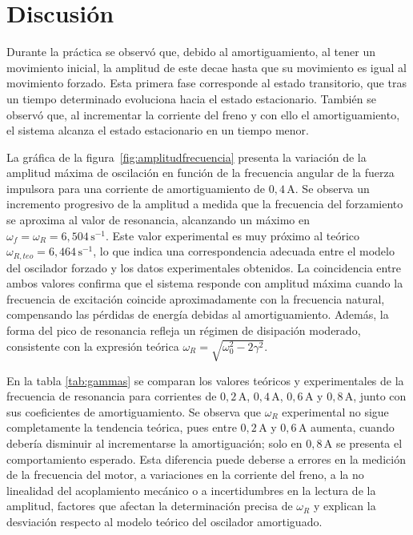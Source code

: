 \section*{Discusi\'on}

Durante la pr\'actica se observ\'o que, debido al amortiguamiento, al tener un 
movimiento inicial, la amplitud de este decae hasta que su movimiento es igual 
al movimiento forzado. Esta primera fase corresponde al estado transitorio, que 
tras un tiempo determinado evoluciona hacia el estado estacionario. Tambi\'en se 
observ\'o que, al incrementar la corriente del freno y con ello el 
amortiguamiento, el sistema alcanza el estado estacionario en un tiempo menor.

La gr\'afica de la figura~\ref{fig:amplitudfrecuencia} presenta la variaci\'on de la amplitud m\'axima 
de oscilaci\'on en funci\'on de la frecuencia angular de la fuerza impulsora 
para una corriente de amortiguamiento de \(0{,}4\,\text{A}\). Se observa un 
incremento progresivo de la amplitud a medida que la frecuencia del 
forzamiento se aproxima al valor de resonancia, alcanzando un m\'aximo en 
\(\omega_f = \omega_R = 6{,}504\,\text{s}^{-1}\). Este valor experimental es muy 
pr\'oximo al te\'orico \(\omega_{R,teo} = 6{,}464\,\text{s}^{-1}\), lo que indica 
una correspondencia adecuada entre el modelo del oscilador forzado y los datos 
experimentales obtenidos. La coincidencia entre ambos valores confirma que el 
sistema responde con amplitud m\'axima cuando la frecuencia de excitaci\'on 
coincide aproximadamente con la frecuencia natural, compensando las p\'erdidas 
de energ\'ia debidas al amortiguamiento. Adem\'as, la forma del pico de 
resonancia refleja un r\'egimen de disipaci\'on moderado, consistente con la 
expresi\'on te\'orica \(\omega_R = \sqrt{\omega_0^2 - 2\gamma^2}\).

En la tabla \ref{tab:gammas} se comparan los valores te\'oricos y experimentales de la 
frecuencia de resonancia para corrientes de \(0{,}2\,\text{A}\), 
\(0{,}4\,\text{A}\), \(0{,}6\,\text{A}\) y \(0{,}8\,\text{A}\), junto con sus 
coeficientes de amortiguamiento. Se observa que \(\omega_R\) experimental no 
sigue completamente la tendencia te\'orica, pues entre \(0{,}2\,\text{A}\) y 
\(0{,}6\,\text{A}\) aumenta, cuando deber\'ia disminuir al incrementarse la 
amortiguaci\'on; solo en \(0{,}8\,\text{A}\) se presenta el comportamiento 
esperado. Esta diferencia puede deberse a errores en la medici\'on de la 
frecuencia del motor, a variaciones en la corriente del freno, a la no 
linealidad del acoplamiento mec\'anico o a incertidumbres en la lectura de la 
amplitud, factores que afectan la determinaci\'on precisa de \(\omega_R\) y 
explican la desviaci\'on respecto al modelo te\'orico del oscilador amortiguado.

